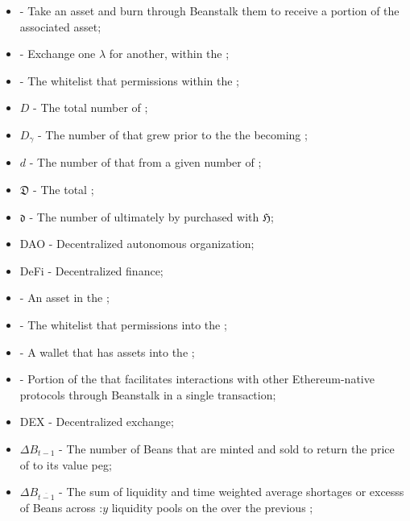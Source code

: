 \documentclass[class=article, crop=false]{standalone}
\begin{document}
\begin{itemize}[topsep=0pt, itemsep=3pt,leftmargin=16pt]
    \item[]  - \hypertarget{ht35}{Take an  asset and burn through Beanstalk them to receive a portion of the associated  asset};
    \item[]  - \hypertarget{ht36}{Exchange one  $\lambda$ for another, within the };
    \item[]  - \hypertarget{ht37}{The whitelist that permissions  within the };
    \item[] $D$ - \hypertarget{ht38}{The total number of };
    \item[] $D_{\gamma}$ - \hypertarget{ht39}{The number of  that grew prior to the the  becoming };
    \item[] $d$ - \hypertarget{ht40}{The number of  that  from a given number of  \Bean};
    \item[] $\mathfrak{D}$ - \hypertarget{ht41}{The total };
    \item[] $\mathfrak{d}$ - \hypertarget{ht42}{The number of  ultimately  by  purchased with  $\mathfrak{H}$};
    \item[] DAO - \hypertarget{ht43}{Decentralized autonomous organization};
    \item[] DeFi - \hypertarget{ht44}{Decentralized finance};
    \item[]  - \hypertarget{ht45}{An asset in the };
    \item[]  - \hypertarget{ht46}{The whitelist that permissions  into the };
    \item[]  - \hypertarget{ht47}{A wallet that has  assets into the };
    \item[]  - \hypertarget{ht48}{Portion of the  that facilitates interactions with other Ethereum-native protocols through Beanstalk in a single transaction};
    \item[] DEX - Decentralized exchange;
    \item[] $\Delta B_{t-1}$ - \hypertarget{ht49}{The number of Beans that are minted and sold to return the price of  to its value peg};
    \item[] $\Delta B_{\overline{t-1}}$ - \hypertarget{ht50}{The sum of liquidity and time weighted average shortages or excesss of Beans across \Bean:$y$ liquidity pools on the  over the previous };

\end{itemize}
\end{document}
